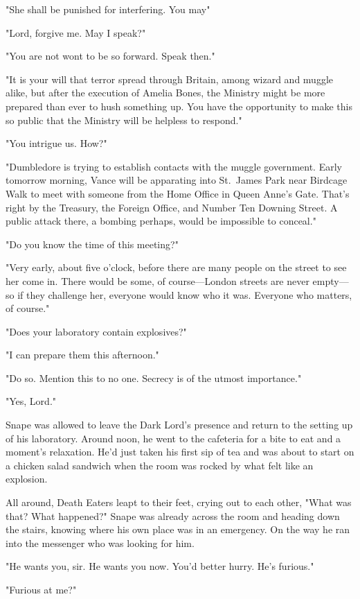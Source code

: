 "She shall be punished for interfering. You may{\el}"

"Lord, forgive me. May I speak?"

"You are not wont to be so forward. Speak then."

"It is your will that terror spread through Britain, among wizard and muggle alike, but after the execution of Amelia Bones, the Ministry might be more prepared than ever to hush something up. You have the opportunity to make this so public that the Ministry will be helpless to respond."

"You intrigue us. How?"

"Dumbledore is trying to establish contacts with the muggle government. Early tomorrow morning, Vance will be apparating into St.~James Park near Birdcage Walk to meet with someone from the Home Office in Queen Anne's Gate. That's right by the Treasury, the Foreign Office, and Number Ten Downing Street. A public attack there, a bombing perhaps, would be impossible to conceal."

"Do you know the time of this meeting?"

"Very early, about five o'clock, before there are many people on the street to see her come in. There would be some, of course—London streets are never empty—so if they challenge her, everyone would know who it was. Everyone who matters, of course."

"Does your laboratory contain explosives?"

"I can prepare them this afternoon."

"Do so. Mention this to no one. Secrecy is of the utmost importance."

"Yes, Lord."

Snape was allowed to leave the Dark Lord's presence and return to the setting up of his laboratory. Around noon, he went to the cafeteria for a bite to eat and a moment's relaxation. He'd just taken his first sip of tea and was about to start on a chicken salad sandwich when the room was rocked by what felt like an explosion.

All around, Death Eaters leapt to their feet, crying out to each other, "What was that? What happened?" Snape was already across the room and heading down the stairs, knowing where his own place was in an emergency. On the way he ran into the messenger who was looking for him.

"He wants you, sir. He wants you now. You'd better hurry. He's furious."

"Furious at me?"

